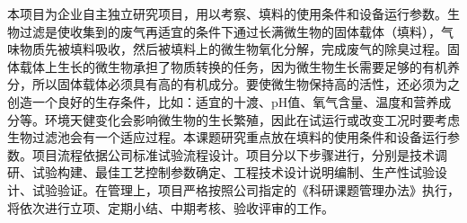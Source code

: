 本项目为企业自主独立研究项目，用以考察、填料的使用条件和设备运行参数。生物过滤是使收集到的废气再适宜的条件下通过长满微生物的固体载体（填料），气味物质先被填料吸收，然后被填料上的微生物氧化分解，完成废气的除臭过程。固体载体上生长的微生物承担了物质转换的任务，因为微生物生长需要足够的有机养分，所以固体载体必须具有高的有机成分。要使微生物保持高的活性，还必须为之创造一个良好的生存条件，比如：适宜的十渡、pH值、氧气含量、温度和营养成分等。环境天健变化会影响微生物的生长繁殖，因此在试运行或改变工况时要考虑生物过滤池会有一个适应过程。本课题研究重点放在填料的使用条件和设备运行参数。项目流程依据公司标准试验流程设计。项目分以下步骤进行，分别是技术调研、试验构建、最佳工艺控制参数确定、工程技术设计说明编制、生产性试验设计、试验验证。在管理上，项目严格按照公司指定的《科研课题管理办法》执行，将依次进行立项、定期小结、中期考核、验收评审的工作。